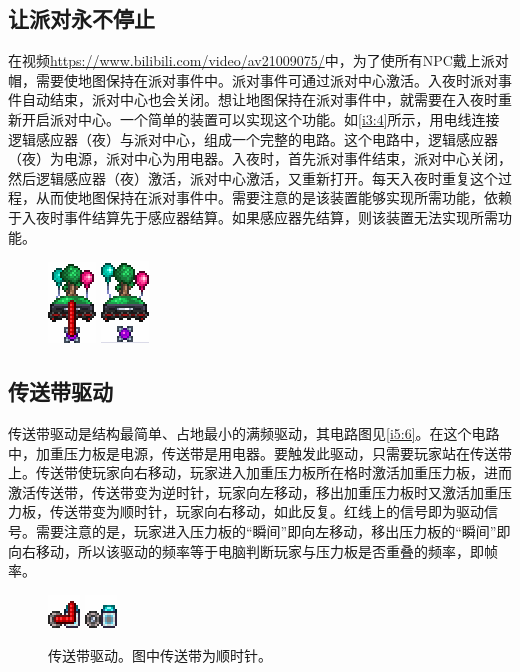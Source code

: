 \subsection{让派对永不停止}

在视频\url{https://www.bilibili.com/video/av21009075/}中，为了使所有NPC戴上派对帽，需要使地图保持在派对事件中。派对事件可通过派对中心激活。入夜时派对事件自动结束，派对中心也会关闭。想让地图保持在派对事件中，就需要在入夜时重新开启派对中心。一个简单的装置可以实现这个功能。如\autoref{i3:4}所示，用电线连接逻辑感应器（夜）与派对中心，组成一个完整的电路。这个电路中，逻辑感应器（夜）为电源，派对中心为用电器。入夜时，首先派对事件结束，派对中心关闭，然后逻辑感应器（夜）激活，派对中心激活，又重新打开。每天入夜时重复这个过程，从而使地图保持在派对事件中。需要注意的是该装置能够实现所需功能，依赖于入夜时事件结算先于感应器结算。如果感应器先结算，则该装置无法实现所需功能。

\begin{figure}[!h]
\begin{center}
\includegraphics{images/3.png}
\qquad
\includegraphics{images/4.png}
\end{center}
\caption{}
\label{i3:4}
\end{figure}

\subsection{传送带驱动}

传送带驱动是结构最简单、占地最小的满频驱动，其电路图见\autoref{i5:6}。在这个电路中，加重压力板是电源，传送带是用电器。要触发此驱动，只需要玩家站在传送带上。传送带使玩家向右移动，玩家进入加重压力板所在格时激活加重压力板，进而激活传送带，传送带变为逆时针，玩家向左移动，移出加重压力板时又激活加重压力板，传送带变为顺时针，玩家向右移动，如此反复。红线上的信号即为驱动信号。需要注意的是，玩家进入压力板的“瞬间”即向左移动，移出压力板的“瞬间”即向右移动，所以该驱动的频率等于电脑判断玩家与压力板是否重叠的频率，即帧率。

\begin{figure}[!h]
\begin{center}
\includegraphics{images/5.png}
\qquad
\includegraphics{images/6.png}
\end{center}
\caption{传送带驱动。图中传送带为顺时针。}
\label{i5:6}
\end{figure}

